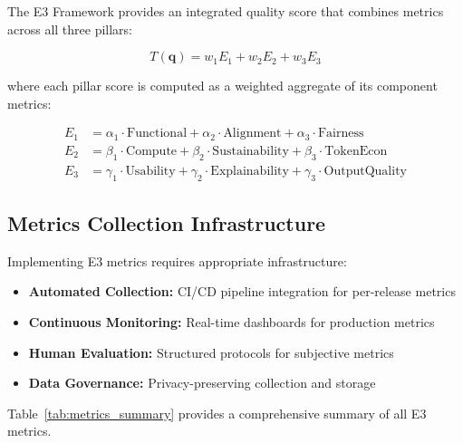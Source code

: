 The E3 Framework provides an integrated quality score that combines metrics across all three pillars:

\begin{equation}
T(\mathbf{q}) = w_1 E_1 + w_2 E_2 + w_3 E_3
\end{equation}

where each pillar score is computed as a weighted aggregate of its component metrics:

\begin{align}
E_1 &= \alpha_1 \cdot \text{Functional} + \alpha_2 \cdot \text{Alignment} + \alpha_3 \cdot \text{Fairness} \\
E_2 &= \beta_1 \cdot \text{Compute} + \beta_2 \cdot \text{Sustainability} + \beta_3 \cdot \text{TokenEcon} \\
E_3 &= \gamma_1 \cdot \text{Usability} + \gamma_2 \cdot \text{Explainability} + \gamma_3 \cdot \text{OutputQuality}
\end{align}

\subsection{Metrics Collection Infrastructure}

Implementing E3 metrics requires appropriate infrastructure:

\begin{itemize}[leftmargin=2em]
    \item \textbf{Automated Collection:} CI/CD pipeline integration for per-release metrics
    \item \textbf{Continuous Monitoring:} Real-time dashboards for production metrics
    \item \textbf{Human Evaluation:} Structured protocols for subjective metrics
    \item \textbf{Data Governance:} Privacy-preserving collection and storage
\end{itemize}

Table~\ref{tab:metrics_summary} provides a comprehensive summary of all E3 metrics.

